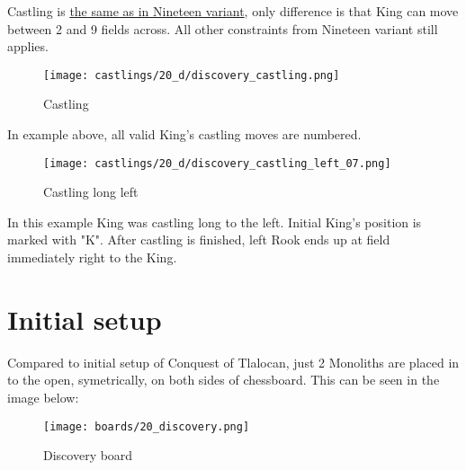 Castling is
\hyperref[sec:Nineteen/Castling]{the same as in Nineteen variant},
only difference is that King can move
between 2 and 9 fields across. All other constraints from Nineteen variant still
applies.

\noindent
\begin{figure}[!h]
\texttt{[image: castlings/20\_d/discovery\_castling.png]}
\caption{Castling}
\label{fig:discovery_castling}
\end{figure}

In example above, all valid King's castling moves are numbered.

\noindent
\begin{figure}[!h]
\texttt{[image: castlings/20\_d/discovery\_castling\_left\_07.png]}
\caption{Castling long left}
\label{fig:discovery_castling_left_07}
\end{figure}

In this example King was castling long to the left. Initial King's position is marked with "K".
After castling is finished, left Rook ends up at field immediately right to the King.

\clearpage %

\section*{Initial setup}
\label{sec:Discovery/Initial setup}

Compared to initial setup of Conquest of Tlalocan, just 2 Monoliths are placed in to the open,
symetrically, on both sides of chessboard. This can be seen in the image below:

\noindent
\begin{figure}[h]
\texttt{[image: boards/20\_discovery.png]}
\caption{Discovery board}
\label{fig:20_discovery}
\end{figure}

\clearpage %
